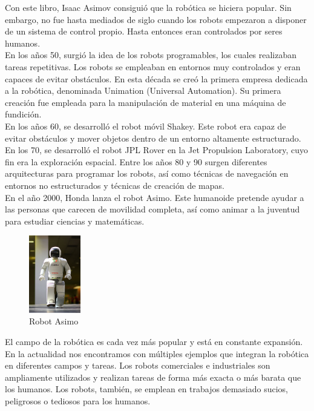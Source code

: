 Con este libro, Isaac Asimov consiguió que la robótica se hiciera popular. Sin embargo, no fue hasta mediados de siglo cuando los robots empezaron a disponer de un sistema de control propio. Hasta entonces eran controlados por seres humanos.\\

En los años 50, surgió la idea de los robots programables, los cuales realizaban tareas repetitivas. Los robots se empleaban en entornos muy controlados y eran capaces de evitar obstáculos. En esta década se creó la primera empresa dedicada a la robótica, denominada Unimation (Universal Automation). Su primera creación fue empleada para la manipulación de material en una máquina de fundición.\\

En los años 60, se desarrolló el robot móvil Shakey. Este robot era capaz de evitar obstáculos y mover objetos dentro de un entorno altamente estructurado. En los 70, se desarrolló el robot JPL Rover en la Jet Propulsion Laboratory, cuyo fin era  la exploración espacial. Entre los años 80 y 90 surgen diferentes arquitecturas para programar los robots, así como técnicas de navegación en entornos no estructurados y técnicas de creación de mapas. \\

En el año 2000, Honda lanza el robot Asimo. Este humanoide pretende ayudar a las personas que carecen de movilidad completa, así como animar a la juventud para estudiar ciencias y matemáticas.\\

\begin{figure}[H]
  \begin{center}
    \includegraphics[width=0.2\textwidth]{figures/Introduccion/asimo.png}
		\caption{Robot Asimo}
		\label{fig.asimo}
		\end{center}
\end{figure}

El campo de la robótica es cada vez más popular y está en constante expansión. En la actualidad nos encontramos con múltiples ejemplos que integran la robótica en diferentes campos y tareas. Los robots comerciales e industriales son ampliamente utilizados y realizan tareas de forma más exacta o más barata que los humanos. Los robots, también, se emplean en trabajos demasiado sucios, peligrosos o tediosos para los humanos.\\

